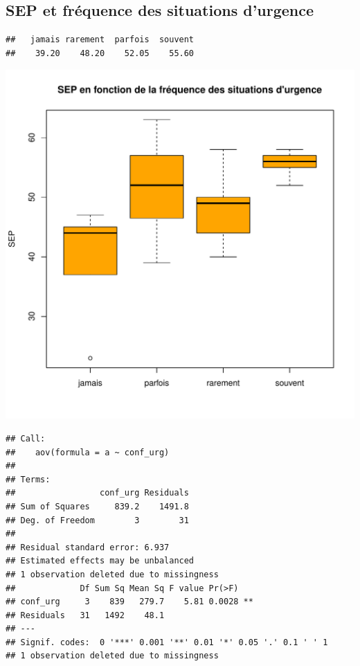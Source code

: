 \documentclass[12pt,english,french]{article}\usepackage{graphicx, color}
\makeatletter
\def\maxwidth{ %
  \ifdim\Gin@nat@width>\linewidth
    \linewidth
  \else
    \Gin@nat@width
  \fi
}
\newenvironment{kframe}{%
 \def\at@end@of@kframe{}%
 \ifinner\ifhmode%
  \def\at@end@of@kframe{\end{minipage}}%
  \begin{minipage}{\columnwidth}%
 \fi\fi%
 \def\FrameCommand##1{\hskip\@totalleftmargin \hskip-\fboxsep
 \colorbox{shadecolor}{##1}\hskip-\fboxsep
     \hskip-\linewidth \hskip-\@totalleftmargin \hskip\columnwidth}%
 \MakeFramed {\advance\hsize-\width
   \@totalleftmargin\z@ \linewidth\hsize
   \@setminipage}}%
 {\par\unskip\endMakeFramed%
 \at@end@of@kframe}
\newenvironment{knitrout}{}{} %
\makeatother
\begin{document}
\subsection{SEP et fréquence des situations d'urgence}
\begin{knitrout}
\color{fgcolor}\begin{kframe}
\begin{verbatim}
##   jamais rarement  parfois  souvent 
##    39.20    48.20    52.05    55.60
\end{verbatim}
\end{kframe}
\includegraphics[width=\maxwidth]{figure/sepexp1} 
\begin{kframe}\begin{verbatim}
## Call:
##    aov(formula = a ~ conf_urg)
## 
## Terms:
##                 conf_urg Residuals
## Sum of Squares     839.2    1491.8
## Deg. of Freedom        3        31
## 
## Residual standard error: 6.937 
## Estimated effects may be unbalanced
## 1 observation deleted due to missingness
##             Df Sum Sq Mean Sq F value Pr(>F)   
## conf_urg     3    839   279.7    5.81 0.0028 **
## Residuals   31   1492    48.1                  
## ---
## Signif. codes:  0 '***' 0.001 '**' 0.01 '*' 0.05 '.' 0.1 ' ' 1 
## 1 observation deleted due to missingness

\end{verbatim}
\end{kframe}
\end{knitrout}
\end{document}
